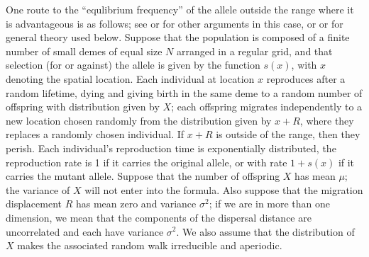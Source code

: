 \documentclass{article}
\begin{document}
One route to the ``equlibrium frequency'' of the allele outside the range where it is advantageous is as follows;
see \citet{slatkin1973geneflow} or \citet{barton1987establishment,pollak1966survival} for other arguments in this case, 
or \citet{etheridge2000introduction} or \citet{dawson1993measurevalued} for general theory used below.
Suppose that the population is composed of a finite number of small demes of equal size $N$ arranged in a regular grid,
and that selection (for or against) the allele is given by the function $s(x)$, with $x$ denoting the spatial location.
Each individual at location $x$ reproduces after a random lifetime,
dying and giving birth in the same deme to a random number of offspring with distribution given by $X$;
each offspring migrates independently to a new location chosen randomly from the distribution given by $x+R$,
where they replaces a randomly chosen individual.
If $x+R$ is outside of the range, then they perish.
Each individual's reproduction time is exponentially distributed, 
the reproduction rate is 1 if it carries the original allele, or with rate $1+s(x)$ if it carries the mutant allele.
Suppose that the number of offspring $X$ has mean $\mu$; the variance of $X$ will not enter into the formula.
Also suppose that the migration displacement $R$ has mean zero and variance $\sigma^2$;
if we are in more than one dimension, we mean that the components of the dispersal distance are uncorrelated
and each have variance $\sigma^2$.
We also assume that the distribution of $X$ makes the associated random walk irreducible and aperiodic.
\end{document}
